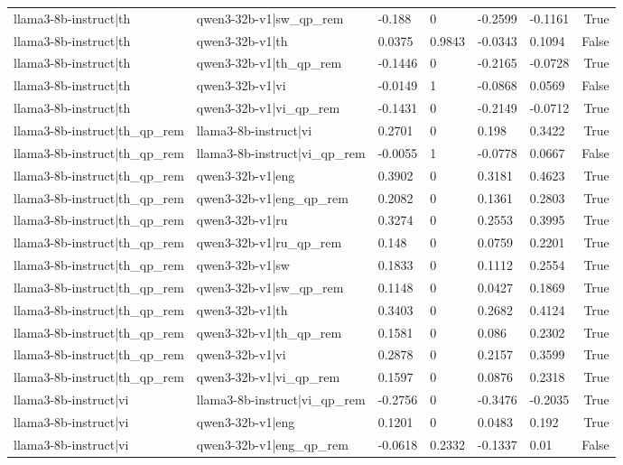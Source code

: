 \begin{table}
\begin{tabular}{llllllr}
llama3-8b-instruct|th & qwen3-32b-v1|sw_qp_rem & -0.188 & 0 & -0.2599 & -0.1161 & True \\
llama3-8b-instruct|th & qwen3-32b-v1|th & 0.0375 & 0.9843 & -0.0343 & 0.1094 & False \\
llama3-8b-instruct|th & qwen3-32b-v1|th_qp_rem & -0.1446 & 0 & -0.2165 & -0.0728 & True \\
llama3-8b-instruct|th & qwen3-32b-v1|vi & -0.0149 & 1 & -0.0868 & 0.0569 & False \\
llama3-8b-instruct|th & qwen3-32b-v1|vi_qp_rem & -0.1431 & 0 & -0.2149 & -0.0712 & True \\
llama3-8b-instruct|th_qp_rem & llama3-8b-instruct|vi & 0.2701 & 0 & 0.198 & 0.3422 & True \\
llama3-8b-instruct|th_qp_rem & llama3-8b-instruct|vi_qp_rem & -0.0055 & 1 & -0.0778 & 0.0667 & False \\
llama3-8b-instruct|th_qp_rem & qwen3-32b-v1|eng & 0.3902 & 0 & 0.3181 & 0.4623 & True \\
llama3-8b-instruct|th_qp_rem & qwen3-32b-v1|eng_qp_rem & 0.2082 & 0 & 0.1361 & 0.2803 & True \\
llama3-8b-instruct|th_qp_rem & qwen3-32b-v1|ru & 0.3274 & 0 & 0.2553 & 0.3995 & True \\
llama3-8b-instruct|th_qp_rem & qwen3-32b-v1|ru_qp_rem & 0.148 & 0 & 0.0759 & 0.2201 & True \\
llama3-8b-instruct|th_qp_rem & qwen3-32b-v1|sw & 0.1833 & 0 & 0.1112 & 0.2554 & True \\
llama3-8b-instruct|th_qp_rem & qwen3-32b-v1|sw_qp_rem & 0.1148 & 0 & 0.0427 & 0.1869 & True \\
llama3-8b-instruct|th_qp_rem & qwen3-32b-v1|th & 0.3403 & 0 & 0.2682 & 0.4124 & True \\
llama3-8b-instruct|th_qp_rem & qwen3-32b-v1|th_qp_rem & 0.1581 & 0 & 0.086 & 0.2302 & True \\
llama3-8b-instruct|th_qp_rem & qwen3-32b-v1|vi & 0.2878 & 0 & 0.2157 & 0.3599 & True \\
llama3-8b-instruct|th_qp_rem & qwen3-32b-v1|vi_qp_rem & 0.1597 & 0 & 0.0876 & 0.2318 & True \\
llama3-8b-instruct|vi & llama3-8b-instruct|vi_qp_rem & -0.2756 & 0 & -0.3476 & -0.2035 & True \\
llama3-8b-instruct|vi & qwen3-32b-v1|eng & 0.1201 & 0 & 0.0483 & 0.192 & True \\
llama3-8b-instruct|vi & qwen3-32b-v1|eng_qp_rem & -0.0618 & 0.2332 & -0.1337 & 0.01 & False \\

\end{tabular}
\end{table}
